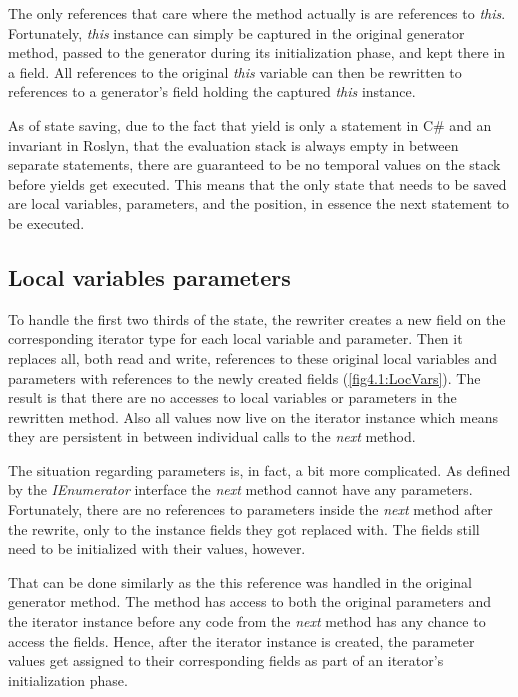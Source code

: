 The only references that care where the method actually is are references to \emph{this}. Fortunately, \emph{this} instance can simply be captured in the original generator method, passed to the generator during its initialization phase, and kept there in a field. All references to the original \emph{this} variable can then be rewritten to references to a generator’s field holding the captured \emph{this} instance.

As of state saving, due to the fact that yield is only a statement in C\# and an invariant in Roslyn, that the evaluation stack is always empty in between separate statements, there are guaranteed to be no temporal values on the stack before yields get executed. This means that the only state that needs to be saved are local variables, parameters, and the position, in essence the next statement to be executed.


\subsection{Local variables parameters}

To handle the first two thirds of the state, the rewriter creates a new field on the corresponding iterator type for each local variable and parameter. Then it replaces all, both read and write, references to these original local variables and parameters with references to the newly created fields (\autoref{fig4.1:LocVars}). The result is that there are no accesses to local variables or parameters in the rewritten method. Also all values now live on the iterator instance which means they are persistent in between individual calls to the \emph{next} method.

The situation regarding parameters is, in fact, a bit more complicated. As defined by the \emph{IEnumerator} interface the \emph{next} method cannot have any parameters. Fortunately, there are no references to parameters inside the \emph{next} method after the rewrite, only to the instance fields they got replaced with. The fields still need to be initialized with their values, however.

That can be done similarly as the this reference was handled in the original generator method. The method has access to both the original parameters and the iterator instance before any code from the \emph{next} method has any chance to access the fields. Hence, after the iterator instance is created, the parameter values get assigned to their corresponding fields as part of an iterator’s initialization phase.

